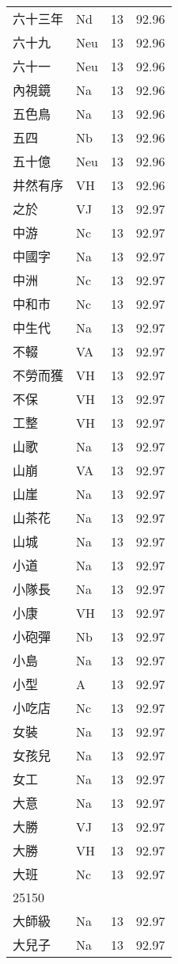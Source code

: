 \documentclass[twocolumn]{book}
\begin{document}
\begin{supertabular}{llrr}
六十三年 & Nd & 13 &  92.96\\
六十九 & Neu & 13 &  92.96\\
六十一 & Neu & 13 &  92.96\\
內視鏡 & Na & 13 &  92.96\\
五色鳥 & Na & 13 &  92.96\\
五四 & Nb & 13 &  92.96\\
五十億 & Neu & 13 &  92.96\\
井然有序 & VH & 13 &  92.96\\
之於 & VJ & 13 &  92.97\\
中游 & Nc & 13 &  92.97\\
中國字 & Na & 13 &  92.97\\
中洲 & Nc & 13 &  92.97\\
中和市 & Nc & 13 &  92.97\\
中生代 & Na & 13 &  92.97\\
不輟 & VA & 13 &  92.97\\
不勞而獲 & VH & 13 &  92.97\\
不保 & VH & 13 &  92.97\\
工整 & VH & 13 &  92.97\\
山歌 & Na & 13 &  92.97\\
山崩 & VA & 13 &  92.97\\
山崖 & Na & 13 &  92.97\\
山茶花 & Na & 13 &  92.97\\
山城 & Na & 13 &  92.97\\
小道 & Na & 13 &  92.97\\
小隊長 & Na & 13 &  92.97\\
小康 & VH & 13 &  92.97\\
小砲彈 & Nb & 13 &  92.97\\
小島 & Na & 13 &  92.97\\
小型 & A & 13 &  92.97\\
小吃店 & Nc & 13 &  92.97\\
女裝 & Na & 13 &  92.97\\
女孩兒 & Na & 13 &  92.97\\
女工 & Na & 13 &  92.97\\
大意 & Na & 13 &  92.97\\
大勝 & VJ & 13 &  92.97\\
大勝 & VH & 13 &  92.97\\
大班 & Nc & 13 &  92.97\\
25150\\
大師級 & Na & 13 &  92.97\\
大兒子 & Na & 13 &  92.97\\

\end{supertabular}
\end{document}
